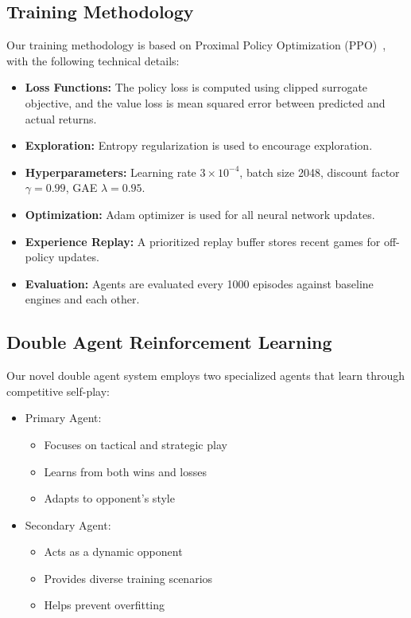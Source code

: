 \documentclass[conference]{IEEEtran}
\begin{document}
\subsection{Training Methodology}
Our training methodology is based on Proximal Policy Optimization (PPO)~\cite{b2}, with the following technical details:
\begin{itemize}
    \item \textbf{Loss Functions:} The policy loss is computed using clipped surrogate objective, and the value loss is mean squared error between predicted and actual returns.
    \item \textbf{Exploration:} Entropy regularization is used to encourage exploration.
    \item \textbf{Hyperparameters:} Learning rate $3\times10^{-4}$, batch size 2048, discount factor $\gamma=0.99$, GAE $\lambda=0.95$.
    \item \textbf{Optimization:} Adam optimizer is used for all neural network updates.
    \item \textbf{Experience Replay:} A prioritized replay buffer stores recent games for off-policy updates.
    \item \textbf{Evaluation:} Agents are evaluated every 1000 episodes against baseline engines and each other.
\end{itemize}

\subsection{Double Agent Reinforcement Learning}
Our novel double agent system employs two specialized agents that learn through competitive self-play:

\begin{itemize}
\item Primary Agent:
   \begin{itemize}
   \item Focuses on tactical and strategic play
   \item Learns from both wins and losses
   \item Adapts to opponent's style
   \end{itemize}

\item Secondary Agent:
   \begin{itemize}
   \item Acts as a dynamic opponent
   \item Provides diverse training scenarios
   \item Helps prevent overfitting
   \end{itemize}
\end{itemize}
\end{document}
